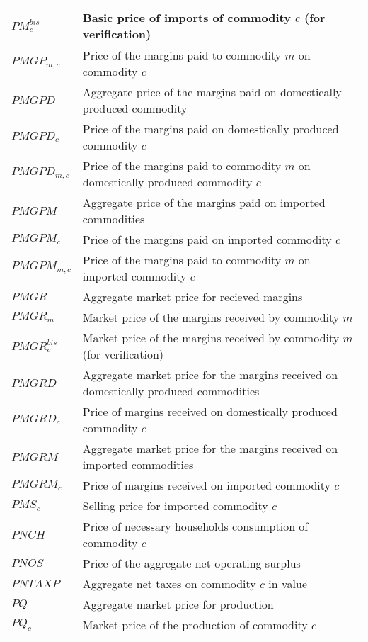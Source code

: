 \documentclass[12pt]{article}
\numberwithin{equation}{section}
\begin{document}
\begin{longtable}{@{}p{4cm}p{9cm}@{}}
 \midrule 
$PM^{bis}_{c}$ & Basic price of imports of commodity $c$ (for verification) \\
 \midrule 
$PMGP_{m, c}$ & Price of the margins paid to commodity $m$ on commodity $c$ \\
 \midrule 
$PMGPD$ & Aggregate price of the margins paid on domestically produced commodity \\
 \midrule 
$PMGPD_{c}$ & Price of the margins paid on domestically produced commodity $c$ \\
 \midrule 
$PMGPD_{m, c}$ & Price of the margins paid to commodity $m$ on domestically produced commodity $c$ \\
 \midrule 
$PMGPM$ & Aggregate price of the margins paid on imported commodities \\
 \midrule 
$PMGPM_{c}$ & Price of the margins paid on imported commodity $c$ \\
 \midrule 
$PMGPM_{m, c}$ & Price of the margins paid to commodity $m$ on imported commodity $c$ \\
 \midrule 
$PMGR$ & Aggregate market price for recieved margins \\
 \midrule 
$PMGR_{m}$ & Market price of the margins received by commodity $m$ \\
 \midrule 
$PMGR^{bis}_{c}$ & Market price of the margins received by commodity $m$ (for verification) \\
 \midrule 
$PMGRD$ & Aggregate market price for the margins received on domestically produced commodities \\
 \midrule 
$PMGRD_{c}$ & Price of margins received on domestically produced commodity $c$ \\
 \midrule 
$PMGRM$ & Aggregate market price for the margins received on imported commodities \\
 \midrule 
$PMGRM_{c}$ & Price of margins received on imported commodity $c$ \\
 \midrule 
$PMS_{c}$ & Selling price for imported commodity $c$ \\
 \midrule 
$PNCH$ & Price of necessary households consumption of commodity $c$ \\
 \midrule 
$PNOS$ & Price of the aggregate net operating surplus \\
 \midrule 
$PNTAXP$ & Aggregate net taxes on commodity $c$ in value \\
 \midrule 
$PQ$ & Aggregate market price for production \\
 \midrule 
$PQ_{c}$ & Market price of the production of commodity $c$ \\

\end{longtable}
\end{document}

